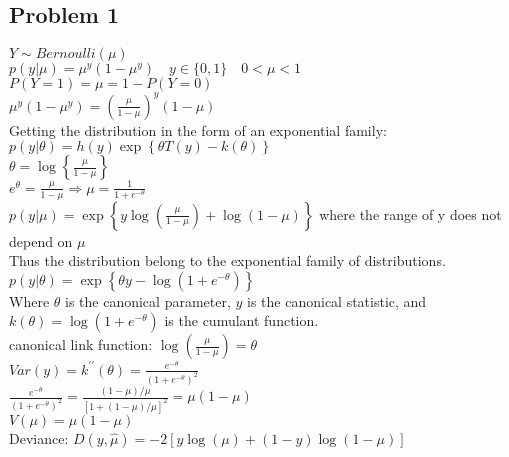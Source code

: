 \documentclass{article}
\newcommand{\ta}{\theta}
\begin{document}
\begin{flushleft}

\section*{Problem 1}
$Y\sim Bernoulli(\mu)$\\
$p(y|\mu)=\mu^y(1-\mu^y) \quad y\in \{0,1\} \quad 0<\mu<1$\\
$P(Y=1)=\mu=1-P(Y=0)$\\
$\mu^y(1-\mu^y)=\left(\frac{\mu}{1-\mu}\right)^y(1-\mu)$\\
Getting the distribution in the form of an exponential family:\\ 
$p(y|\ta)=h(y)\exp\left\{\ta T(y)-k(\ta)\right\}$\\
$\ta=\log\left\{\frac{\mu}{1-\mu}\right\}$\\
$e^{\ta}=\frac{\mu}{1-\mu}\Rightarrow \mu=\frac{1}{1+e^{-\ta}}$\\
$p(y|\mu)=\exp\left\{y\log\left(\frac{\mu}{1-\mu}\right)+\log(1-\mu)\right\}$ where the range of y does not depend on $\mu$\\
Thus the distribution belong to the exponential family of distributions.\\
$p(y|\ta)=\exp\left\{\ta y-\log(1+e^{-\ta})\right\}$\\
Where $\ta$ is the canonical parameter, $y$ is the canonical statistic, and $k(\ta)=\log(1+e^{-\ta})$ is the cumulant function.\\
canonical link function: $\log(\frac{\mu}{1-\mu})=\ta$\\
$Var(y)=k^{\prime \prime}(\ta)=\frac{e^{-\ta}}{(1+e^{-\ta})^2}$\\
$\frac{e^{-\ta}}{(1+e^{-\ta})^2}=\frac{(1-\mu)/\mu}{[1+(1-\mu)/\mu]^2}=\mu(1-\mu)$\\
$V(\mu)=\mu(1-\mu)$\\

Deviance: $D(y,\hat{\mu})=-2\left[y\log(\mu)+(1-y)\log(1-\mu)\right]$


\end{flushleft}
\end{document}
